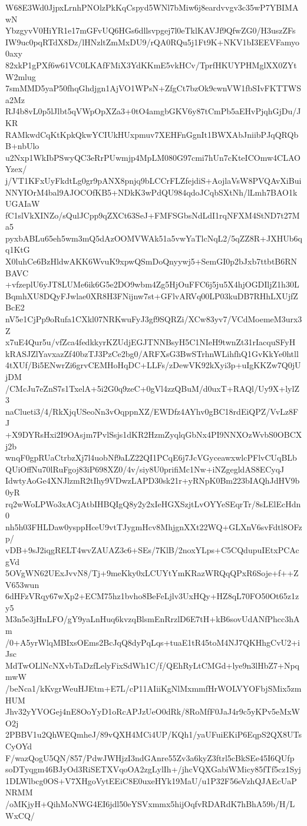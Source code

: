 W68E3Wd0JjpxLrnhPNOlzPkKqCspyd5WNl7bMiw6j8eardvvgv3c35wP7YBIMAwN
YbzgyvV0HiYR1e17mGFvUQ6HGs6dllsvpgej7l0eTklKAVJf9QfwZG0/H3uszZFs
IW9uc0pqRTdX8Dz/lHNzltZmMxDU9/rQA0RQu5j1Ft9K+NKV1bI3EEVFamyo0axy
82xkP1gPXf6w61VC0LKAfFMiX3YdKKmE5vkHCv/TprfHKUYPHMglXX0ZYtW2mlug
7smMMD5yaP50fhqGhdjgn1AjVO1WPsN+ZfgCt7bzOk9cwnVW1fbSIvFKTTWSa2Mz
RJ4b8vL0p5lJlbt5qVWpOpXZa3+0tO4amgbGKV6y87tCmPb5aEHvPjqhGjDu/JKR
RAMkwdCqKtKpkQkwYCIUkHUxpmuv7XEHFnGgnIt1BWXAbJniibPJqQRQbB+nbUlo
u2Nxp1WkIbPSwyQC3eRrPUwmjp4MpLM080G97cmi7hUn7cKteICOmw4CLAOYzex/
j/VT1KFxUyFkdtLg0gr9pANX8pnjq9bLCCrFLZfejdiS+AojlaVsW8PVQAvXiBui
NNYIOrM4bal9AJOCOfKB5+NDkK3wPdQU984qdoJCqbSXtNh/lLmh7BAO1kUGAIaW
fC1slVkXINZo/sQulJCpp9qZXCt63SeJ+FMFSGbsNdLdI1rqNFXM4StND7t27Ma5
pyxbABLu65eh5wm3mQ5dAzOOMVWAk51a5vwYaTlcNqL2/5qZZ8R+JXHUb6qq1KtG
X0luhCe6BzHldwAKK6WvuK9xpwQSmDoQnyywj5+SemGI0p2bJxb7ttbtB6RNBAVC
+vfzeplU6yJT8LUMe6ik6G5e2DO9wbm4Zg5HjOuFFC6j5ju5X4hjOGDIljZ1h30L
BqmhXU8DQyFJwlae0XR8H3FNijnw7st+GFlvARVq00LP03kuDB7RHhLXUjfZBcE2
nV5e1CjPp9oRufa1CXkl07NRKwuFyJ3gf9SQRZi/XCw83yv7/VCdMoemeM3urx3Z
x7uE4Qur5u/vfZca4fedkkyrKZUdjEGJTNNBsyH5C1NIeH9twnZt31rIacquSFyH
kRASJZlYavxazZf40bzTJ3PzCe2bg0/ARFXsG3BwSTrhnWLihfhQ1GvKkYe0htll
4tXUf/Bi5ENwrZi6grvCEMHoHqDC+LLFs/zDewVK92kXyi3p+uIgKKZw7Q0jUjDM
/CMcJu7eZnS7s1TxelA+5i2G0q9zeC+0gVl4zzQBuM/d0uxT+RAQl/Uy9X+lylZ3
naClueti3/4/RkXjqUSeoNn3vOqppnXZ/EWDfz4AYhv0gBC18rdEiQPZ/VvLz8FJ
+X9DYRsHxi2I9OAsjm7PvlSsjs1dKR2HzmZyqlqGbNx4PI9NNXOzWvbS0OBCXj2b
wnqF0gpRUaCtrbzXj7l4uobNf9aLZ22QI1PCqE6j7JcVGyceawxwlcPFlvCUqBLb
QUiOffNu70lRuFgoj83iP698XZ0/4v/siy8U0prifiMc1Nw+iNZgegldAS8ECyqJ
IdwtyAoGe4XNJlzmR2tIhy9VDwzLAPD30sk21r+yRNpK0Bm223bIAQhJdHV9b0yR
rq2wWoLPWo3xACjAtbIHBQIgQ8y2y2xIeHGXSzjtLvOYYeSEqrTr/8sLElEcHdn0
nh5h03FHLDaw0ysppHceU9vtTJygmHcv8MhjgnXXt22WQ+GLXnV6svFdtl8OFzp/
vDB+9sJ2iqgRELT4wvZAUAZ3c6+SEs/7KlB/2noxYLps+C5CQdupuIEtxPCAcgVd
5OVgWN62UExJvvN8/Tj+9meKky0xLCUYtYmKRazWRQqQPxR6Soje+f++ZV653wun
6dHFzVRqy67wXp2+ECM75hz1bvho8BeFeLjlv3UxHQy+HZ8qL70FO50Ot65z1zy5
M3n5e3jHnLFO/gY9yaLnHuq6kvzqBlsmEnRrzlD6E7tH+kB6sovUdANfPhcc3hAm
/0+A5yrWlqMBIxsOEms2BcJqQ8dyPqLqs+tuaE1tR45toM4NJ7QKHhgCvU2+iJsc
MdTwOLlNcNXvbTaDzfLelyFixSdWh1C/f/QEhRyLtCMGd+lye9n3lHbZ7+NpqmwW
/beNca1/kKvgrWeuHJEtm+E7L/cP11AIiiKgNlMxmmfHrWOLVYOFbjSMix5zmHUM
Jhv32yYVOGej4nE8OoYyD1oRcAPJzUeO0dRk/8RoMfF0JaJ4r9c5yKPv5eMxWO2j
2PBBV1u2QhWEQmheJ/89vQXH4MCi4UP/KQh1/yaUFuiEKiP6EqpS2QX8UTsCyOYd
F/wazQogU5QN/857/PdwJWHjzI3ndGAnre55Zv3a6kyZ3ftrl5cBkSEe45I6QUfp
soDTyqgm46BJyOd3RiSETXVqoOA2zgLylIh+/jhcVQXGabiWMicy85fTf5cz1Syj
1DLWlbcg0OS+V7XHgoVytEEiC8E0uxeHYk19MaU/u1P32F56eVzhQJAEcUaPNRMM
/oMKjyH+QihMoNWG4EI6jdl50eYSVxmmx5hijOqfvRDARdK7hBhA59b/H/LWxCQ/
